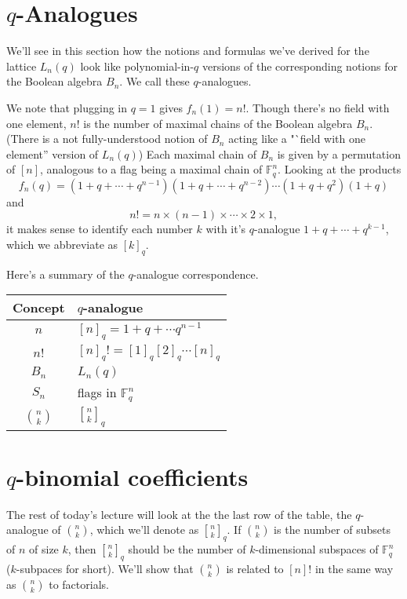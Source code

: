 \documentclass[11pt]{article}
\newcommand{\F}{\mathbb F} %
\newcommand{\qbinom}[2] {{#1 \brack #2}_q}
\begin{document}
\section{$q$-Analogues}

We'll see in this section how the notions and formulas we've derived for the lattice $L_n(q)$ look like polynomial-in-$q$ versions of the corresponding notions for the Boolean algebra $B_n$. We call these $q$-analogues.

We note that plugging in $q=1$ gives $f_n(1) = n!$. Though there's no field with one element, $n!$ is the number of maximal chains of the Boolean algebra $B_n$. (There is a not fully-understood notion of $B_n$ acting like a "`field with one element'' version of $L_n(q)$) Each maximal chain of $B_n$ is given by a permutation of $[n]$, analogous to a flag being a maximal chain of $\F_q^n$. Looking at the products $$f_n(q) = \left(1+q+\cdots+q^{n-1} \right)\left(1+q+\cdots+q^{n-2} \right) \cdots \left(1+q+q^2 \right) \left(1+q \right)$$ and $$n! = n \times (n-1) \times \cdots \times 2 \times 1,$$ it makes sense to identify each number $k$ with it's $q$-analogue $1+q+\cdots+q^{k-1}$, which we abbreviate as $[k]_q$. 

Here's a summary of the $q$-analogue correspondence.

\begin{center}
\begin{tabular}{ c| l } 
Concept & $q$-analogue \\
\hline 
$n$ & $[n]_q = 1 + q + \cdots q^{n-1}$  \\ 
$n!$ & $[n]_q! = [1]_q [2]_q \cdots [n]_q$  \\ 
$B_n$ & $L_n(q)$\\
$S_n$ & flags in $\F_q^n$ \\
$\binom{n}{k}$ & $\qbinom{n}{k}$

\end{tabular}
\end{center}

\section {$q$-binomial coefficients}

The rest of today's lecture will look at the the last row of the table, the $q$-analogue of $\binom{n}{k}$, which we'll denote as $\qbinom{n}{k}$. If $\binom{n}{k}$ is the number of subsets of $n$ of size $k$, then $\qbinom{n}{k}$ should be the number of $k$-dimensional subspaces  of $\F_q^n$ ($k$-subpaces for short). We'll show that $\binom{n}{k}$ is related to $[n]!$ in the same way as $\binom{n}{k}$ to factorials.
\end{document}
